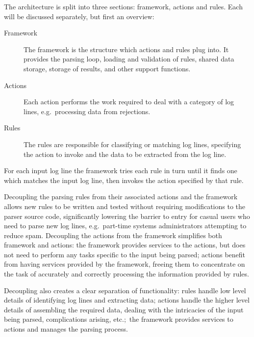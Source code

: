 \documentclass[draft]{svmult}
\begin{document}
\label{Architecture}

The architecture is split into three sections: framework, actions and
rules.  Each will be discussed separately, but first an overview:

\begin{description}

    \item [Framework]  The framework is the structure which actions and
        rules plug into.  It provides the parsing loop, loading and
        validation of rules, shared data storage, storage of results, and
        other support functions.

    \item [Actions]  Each action performs the work required to deal with a
        category of log lines, e.g.\ processing data from rejections.

    \item [Rules]  The rules are responsible for classifying or matching
        log lines, specifying the action to invoke and the data to be
        extracted from the log line.

\end{description}

For each input log line the framework tries each rule in turn until it
finds one which matches the input log line, then invokes the action
specified by that rule.

Decoupling the parsing rules from their associated actions and the
framework allows new rules to be written and tested without requiring
modifications to the parser source code, significantly lowering the barrier
to entry for casual users who need to parse new log lines, e.g.\ part-time
systems administrators attempting to reduce spam.  Decoupling the actions
from the framework simplifies both framework and actions: the framework
provides services to the actions, but does not need to perform any tasks
specific to the input being parsed; actions benefit from having services
provided by the framework, freeing them to concentrate on the task of
accurately and correctly processing the information provided by rules.

Decoupling also creates a clear separation of functionality: rules handle
low level details of identifying log lines and extracting data; actions
handle the higher level details of assembling the required data, dealing
with the intricacies of the input being parsed, complications arising,
etc.;\ the framework provides services to actions and manages the parsing
process.
\end{document}
